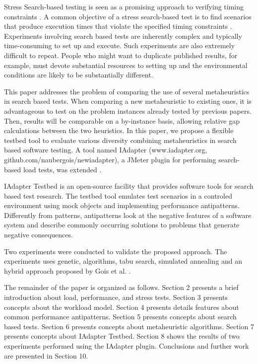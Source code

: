 \documentclass[times]{stvrauth}
\begin{document}
Stress Search-based testing is seen as a promising approach to verifying timing constraints \cite{Afzal2009a}. A common objective of a stress search-based test is to find  scenarios that produce execution times that violate the specified timing constraints \cite{Sullivan}. Experiments involving search based tests are inherently complex and typically time-consuming to set up and
execute. Such experiments are also extremely difficult to
repeat. People who might want to duplicate published results, for example, must devote substantial resources to setting up and the environmental conditions are likely to be substantially different. 


This paper addresses the problem of comparing the use of several metaheuristics in search based tests. When comparing a new metaheuristic to existing ones, it is advantageous to test on the problem instances already tested by previous papers. Then, results will be comparable on a by-instance basis, allowing relative gap calculations between the two heuristics. In this paper, we propose a flexible testbed tool to evaluate various diversity combining metaheuristics in search based software testing. A tool named IAdapter (www.iadapter.org, github.com/naubergois/newiadapter), a JMeter plugin for performing search-based load tests, was extended \cite{Gois2016}. 


IAdapter Testbed is an open-source facility that provides software tools for search based test research. The testbed tool emulates test scenarios in a controled environment using mock objects and implementing performance antipatterns. Differently from patterns, antipatterns look at the negative features of a software system and describe commonly occurring solutions to problems that generate negative consequences.

Two experiments were conducted to validate the proposed approach. The experiments uses genetic, algorithms, tabu search, simulated annealing and an hybrid approach proposed by Gois et al. \cite{Gois2016}.

The remainder of the paper is organized as follows. Section 2 presents a brief introduction about load, performance, and stress tests. Section 3 presents concepts about the workload model. Section 4 presents details features about common performance antipatterns. Section 5 presents concepts about search based tests. Section 6 presents concepts about metaheuristic algorithms. Section 7 presents concepts about IAdapter Testbed. Section 8 shows the results of two experiments performed using the IAdapter plugin.  Conclusions and further work are presented in Section 10.
\end{document}
